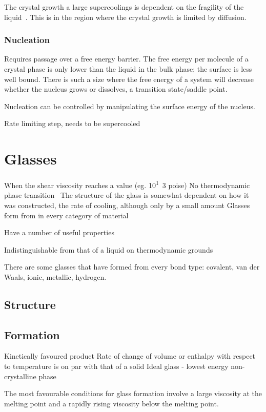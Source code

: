 The crystal growth a large supercoolings is dependent on the fragility of the liquid~\cite{ediger:08}. This is in the region where the crystal growth is limited by diffusion. 


\subsubsection{Nucleation}
Requires passage over a free energy barrier. The free energy per molecule of a crystal phase is only lower than the liquid in the bulk phase; the surface is less well bound. There is such a size where the free energy of a system will decrease whether the nucleus grows or dissolves, a transition state/saddle point.

Nucleation can be controlled by manipulating the surface energy of the nucleus.~\cite{de-yoreo:03}

Rate limiting step, needs to be supercooled

\section{Glasses}
When the shear viscosity reaches a value (eg. \si{10^13} poise)
No thermodynamic phase transition~\cite{santen:00}
The structure of the glass is somewhat dependent on how it was constructed, the rate of cooling, although only by a small amount
Glasses form from in every category of material~\cite{turnbull:69}

Have a number of useful properties~\cite{greer:07}

Indistinguishable from that of a liquid on thermodynamic grounds~\cite{santen:00}

There are some glasses that have formed from every bond type: covalent, van der Waals, ionic, metallic, hydrogen.~\cite{turnbull:06}

\subsection{Structure}


\subsection{Formation}
Kinetically favoured product
Rate of change of volume or enthalpy with respect to temperature is on par with that of a solid
Ideal glass - lowest energy non-crystalline phase

The most favourable conditions for glass formation involve a large viscosity at the melting point and a rapidly rising viscosity below the melting point.~\cite{uhlmann:71}



